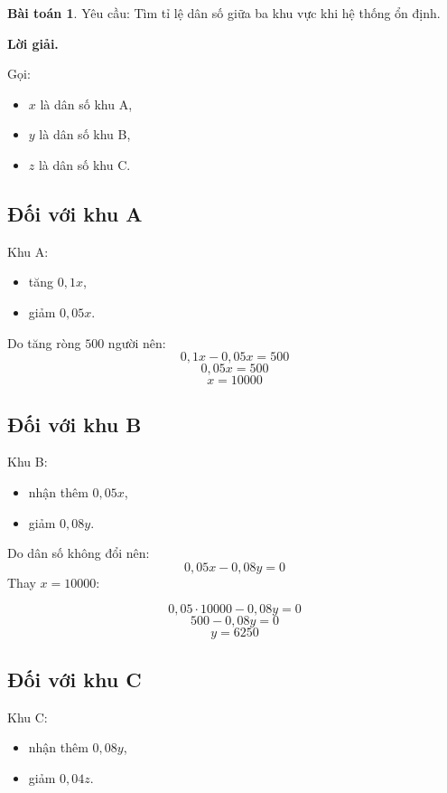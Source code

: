 \documentclass[12pt,a4paper,oneside]{book}
\theoremstyle{theorem}
\theoremstyle{definition}
\newtheorem{bt}[theorem2]{Bài toán}
\begin{document}
\begin{bt}
Yêu cầu: Tìm tỉ lệ dân số giữa ba khu vực khi hệ thống ổn định.

\bigskip

\textbf{Lời giải.}

Gọi:

\begin{itemize}
    \item \(x\) là dân số khu A,
    
    \item \(y\) là dân số khu B,
    
    \item \(z\) là dân số khu C.
\end{itemize}

\subsection*{Đối với khu A}

Khu A:

\begin{itemize}
    \item tăng \(0,1x\),
    
    \item giảm \(0,05x\).
\end{itemize}

Do tăng ròng \(500\) người nên:
\[
0,1x-0,05x=500
\]
\[
0,05x=500
\]
\[
x=10000
\]
\subsection*{Đối với khu B}
Khu B:

\begin{itemize}
    \item nhận thêm \(0,05x\),
    
    \item giảm \(0,08y\).
\end{itemize}

Do dân số không đổi nên:
\[
0,05x-0,08y=0
\]
Thay \(x=10000\):

\[
0,05\cdot10000-0,08y=0
\]
\[
500-0,08y=0
\]
\[
y=6250
\]
\subsection*{Đối với khu C}
Khu C:
\begin{itemize}
    \item nhận thêm \(0,08y\),
    
    \item giảm \(0,04z\).
\end{itemize}


\end{bt}
\end{document}
